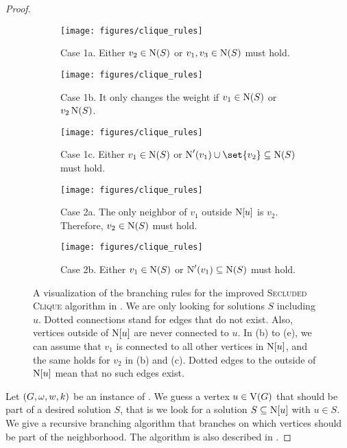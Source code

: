 \begin{lemma}
\begin{proof}
    \begin{figure}[t] \centering \hfill
      \begin{subfigure}{0.32\textwidth} \centering
        \texttt{[image: figures/clique\_rules]}
        \caption{Case 1a. Either $v_2 \in \operatorname{N}({S})$ or $v_1,v_3 \in \operatorname{N}({S})$ must hold.}
      \end{subfigure} \hfill
      \begin{subfigure}{0.32\textwidth} \centering
        \texttt{[image: figures/clique\_rules]}
        \caption{Case 1b. It only changes the weight if $v_1 \in \operatorname{N}({S})$ or $v_2 \operatorname{N}({S})$.}
      \end{subfigure} \hfill
      \begin{subfigure}{0.32\textwidth} \centering
        \texttt{[image: figures/clique\_rules]}
        \caption{Case 1c. Either $v_1 \in \operatorname{N}({S})$ or $\neiOp'(v_1) \cup \set{v_2} \subseteq \nei{S}$ must hold.}
      \end{subfigure} \hfill
      \begin{subfigure}{0.49\textwidth} \centering
        \texttt{[image: figures/clique\_rules]}
        \caption{Case 2a. The only neighbor of $v_1$ outside $\operatorname{N}[{u}]$ is $v_2$. Therefore, $v_2 \in \operatorname{N}({S})$ must hold.}
      \end{subfigure} \hfill
      \begin{subfigure}{0.49\textwidth} \centering
        \texttt{[image: figures/clique\_rules]}
        \caption{Case 2b. Either $v_1 \in \operatorname{N}({S})$ or $\operatorname{N}'(v_1) \subseteq \operatorname{N}({S})$ must hold.}
      \end{subfigure} \hfill
      \caption{A visualization of the branching rules for the improved \textsc{Secluded Clique} algorithm in . We are only looking for solutions $S$ including $u$. Dotted connections stand for edges that do not exist. Also, vertices outside of $\operatorname{N}[{u}]$ are never connected to $u$. In (b) to (e), we can assume that $v_1$ is connected to all other vertices in $\operatorname{N}[{u}]$, and the same holds for $v_2$ in (b) and (c). Dotted edges to the outside of $\operatorname{N}[{u}]$ mean that no such edges exist.}\label{fig:clique2}
    \end{figure}
    
    Let $(G,\operatorname{\omega}, w, k)$ be an instance of \clique{}. 
    We guess a vertex $u\in \operatorname{V}({G})$ that should be part of a desired solution $S$, that is we look for a solution $S \subseteq \operatorname{N}[{u}]$ with $u \in S$. We give a recursive branching algorithm that branches on which vertices should be part of the neighborhood. 
    The algorithm is also described in .
    

\end{proof}
\end{lemma}
